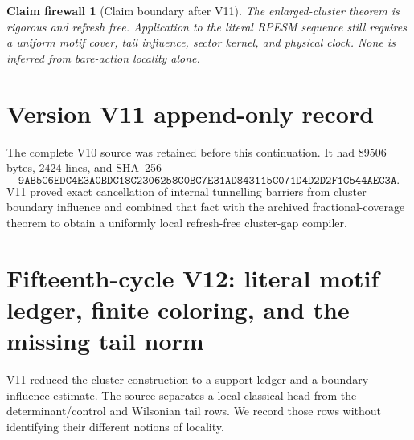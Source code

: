 \documentclass[11pt]{article}
\newtheorem{firewall}[theorem]{Claim firewall}
\theoremstyle{remark}
\begin{document}
\begin{firewall}[Claim boundary after V11]
\label{fire:v15v11}
The enlarged-cluster theorem is rigorous and refresh free.
Application to the literal RPESM sequence still requires a
uniform motif cover, tail influence, sector kernel, and physical
clock.  None is inferred from bare-action locality alone.
\end{firewall}

\section*{Version V11 append-only record}
The complete V10 source was retained before this continuation.  It
had \(89506\) bytes, \(2424\) lines, and SHA--256
\[
 \texttt{9AB5C6EDC4E3A0BDC18C2306258C0BC7E31AD843115C071D4D2D2F1C544AEC3A}.
\]
V11 proved exact cancellation of internal tunnelling barriers from
cluster boundary influence and combined that fact with the
archived fractional-coverage theorem to obtain a uniformly local
refresh-free cluster-gap compiler.


\section{Fifteenth-cycle V12: literal motif ledger, finite coloring, and the missing tail norm}
\label{sec:v15v12}

V11 reduced the cluster construction to a support ledger and a
boundary-influence estimate.  The source separates a local
classical head from the determinant/control and Wilsonian tail
rows.  We record those rows without identifying their different
notions of locality.
\end{document}
